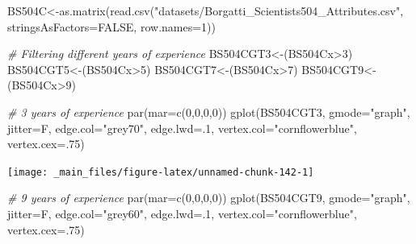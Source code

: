 \documentclass[
  notitlepage,
  onecolumn,
  openany]{book}
\newenvironment{Shaded}{\begin{snugshade}}{\end{snugshade}}
\newcommand{\AttributeTok}[1]{\textcolor[rgb]{0.77,0.63,0.00}{#1}}
\newcommand{\CommentTok}[1]{\textcolor[rgb]{0.56,0.35,0.01}{\textit{#1}}}
\newcommand{\ConstantTok}[1]{\textcolor[rgb]{0.00,0.00,0.00}{#1}}
\newcommand{\DecValTok}[1]{\textcolor[rgb]{0.00,0.00,0.81}{#1}}
\newcommand{\FunctionTok}[1]{\textcolor[rgb]{0.00,0.00,0.00}{#1}}
\newcommand{\NormalTok}[1]{#1}
\newcommand{\OtherTok}[1]{\textcolor[rgb]{0.56,0.35,0.01}{#1}}
\newcommand{\SpecialCharTok}[1]{\textcolor[rgb]{0.00,0.00,0.00}{#1}}
\newcommand{\StringTok}[1]{\textcolor[rgb]{0.31,0.60,0.02}{#1}}
\begin{document}
\begin{Shaded}
\begin{Highlighting}[]
\NormalTok{BS504C}\OtherTok{\textless{}{-}}\FunctionTok{as.matrix}\NormalTok{(}\FunctionTok{read.csv}\NormalTok{(}\StringTok{"datasets/Borgatti\_Scientists504\_Attributes.csv"}\NormalTok{,}
                           \AttributeTok{stringsAsFactors=}\ConstantTok{FALSE}\NormalTok{, }\AttributeTok{row.names=}\DecValTok{1}\NormalTok{))}

\CommentTok{\# Filtering different years of experience}
\NormalTok{BS504CGT3}\OtherTok{\textless{}{-}}\NormalTok{(BS504Cx}\SpecialCharTok{\textgreater{}}\DecValTok{3}\NormalTok{)}
\NormalTok{BS504CGT5}\OtherTok{\textless{}{-}}\NormalTok{(BS504Cx}\SpecialCharTok{\textgreater{}}\DecValTok{5}\NormalTok{)}
\NormalTok{BS504CGT7}\OtherTok{\textless{}{-}}\NormalTok{(BS504Cx}\SpecialCharTok{\textgreater{}}\DecValTok{7}\NormalTok{)}
\NormalTok{BS504CGT9}\OtherTok{\textless{}{-}}\NormalTok{(BS504Cx}\SpecialCharTok{\textgreater{}}\DecValTok{9}\NormalTok{)}
\end{Highlighting}
\end{Shaded}

\begin{Shaded}
\begin{Highlighting}[]
\CommentTok{\# 3 years of experience}
\FunctionTok{par}\NormalTok{(}\AttributeTok{mar=}\FunctionTok{c}\NormalTok{(}\DecValTok{0}\NormalTok{,}\DecValTok{0}\NormalTok{,}\DecValTok{0}\NormalTok{,}\DecValTok{0}\NormalTok{))}
\FunctionTok{gplot}\NormalTok{(BS504CGT3,}
      \AttributeTok{gmode=}\StringTok{"graph"}\NormalTok{,}
      \AttributeTok{jitter=}\NormalTok{F,}
      \AttributeTok{edge.col=}\StringTok{"grey70"}\NormalTok{, }
      \AttributeTok{edge.lwd=}\NormalTok{.}\DecValTok{1}\NormalTok{,}
      \AttributeTok{vertex.col=}\StringTok{"cornflowerblue"}\NormalTok{,}
      \AttributeTok{vertex.cex=}\NormalTok{.}\DecValTok{75}\NormalTok{)}
\end{Highlighting}
\end{Shaded}

\begin{center}\texttt{[image: \_main\_files/figure-latex/unnamed-chunk-142-1]} \end{center}

\begin{Shaded}
\begin{Highlighting}[]
\CommentTok{\# 9 years of experience}
\FunctionTok{par}\NormalTok{(}\AttributeTok{mar=}\FunctionTok{c}\NormalTok{(}\DecValTok{0}\NormalTok{,}\DecValTok{0}\NormalTok{,}\DecValTok{0}\NormalTok{,}\DecValTok{0}\NormalTok{))}
\FunctionTok{gplot}\NormalTok{(BS504CGT9,}
      \AttributeTok{gmode=}\StringTok{"graph"}\NormalTok{,}
      \AttributeTok{jitter=}\NormalTok{F,}
      \AttributeTok{edge.col=}\StringTok{"grey60"}\NormalTok{, }
      \AttributeTok{edge.lwd=}\NormalTok{.}\DecValTok{1}\NormalTok{,}
      \AttributeTok{vertex.col=}\StringTok{"cornflowerblue"}\NormalTok{,}
      \AttributeTok{vertex.cex=}\NormalTok{.}\DecValTok{75}\NormalTok{)}
\end{Highlighting}
\end{Shaded}
\end{document}
